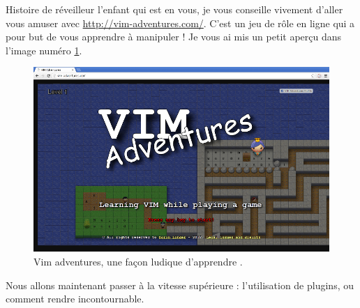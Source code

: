 \bigskip
Histoire de réveilleur l'enfant qui est en vous, je vous conseille vivement d'aller vous amuser avec \url{http://vim-adventures.com/}. C'est un jeu de rôle en ligne qui a pour but de vous apprendre à manipuler \vim ! Je vous ai mis un petit aperçu dans l'image numéro \ref{fig:vim-adventures}.

\begin{figure}%
  \includegraphics[width=\linewidth]{graphics/vim-adventures.png}
  \caption{Vim adventures, une façon ludique d'apprendre \vim.}
  \label{fig:vim-adventures}
\end{figure}


Nous allons maintenant passer à la vitesse supérieure : l'utilisation de plugins, ou comment rendre \vim incontournable.
